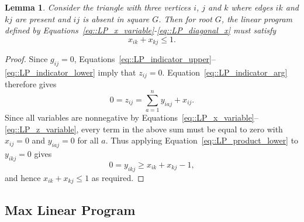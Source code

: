 \documentclass[11pt]{article}
\newtheorem{lemma}{Lemma}
\begin{document}
\begin{lemma} \label{lemma::two_edges_linear_sum}
  Consider the triangle with three vertices $i$, $j$ and $k$ where edges $ik$ and $kj$ are present and $ij$ is absent in square $G$. Then for root $G$, the linear program defined by Equations~\eqref{eq::LP_x_variable}-\eqref{eq::LP_diagonal_x} must satisfy 
  \[
  x_{ik} + x_{kj} \leq 1. 
  \]
\end{lemma}
\begin{proof}
  Since $g_{ij}=0$, Equations~\eqref{eq::LP_indicator_upper}--\eqref{eq::LP_indicator_lower} imply that $z_{ij}=0$.
  Equation~\eqref{eq::LP_indicator_arg} therefore gives
  \[
  0 = z_{ij} = \sum_{a=1}^{n} y_{iaj} + x_{ij}.
  \]
  Since all variables are nonnegative by Equations~\eqref{eq::LP_x_variable}--\eqref{eq::LP_z_variable}, every term in the above sum must be equal to zero with $x_{ij} = 0$ and $y_{iaj} = 0$ for all $a$. Thus applying Equation~\eqref{eq::LP_product_lower} to $y_{ikj} = 0$ gives
  \[
  0 = y_{ikj} \geq x_{ik} + x_{kj} - 1,
  \]
  and hence $x_{ik}+x_{kj} \leq 1$ as required.
\end{proof}

\subsection{Max Linear Program} \label{subsec::triangle_two_edges_max_linear_program}
\end{document}

